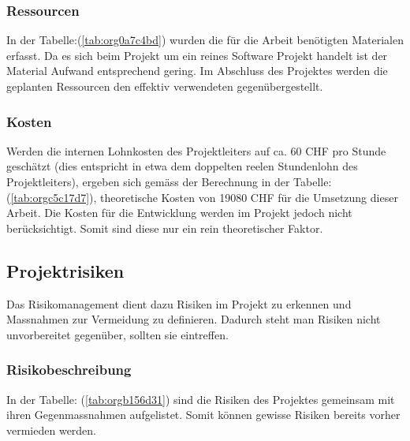 \subsubsection{Ressourcen}
\label{sec:orgf32159d}

In der Tabelle:(\ref{tab:org0a7c4bd}) wurden die für die Arbeit benötigten Materialen
erfasst. Da es sich beim Projekt um ein reines Software Projekt handelt ist der
Material Aufwand entsprechend gering. Im Abschluss des Projektes werden die
geplanten Ressourcen den effektiv verwendeten gegenübergestellt.

\subsubsection{Kosten}
\label{sec:org7c0906b}

Werden die internen Lohnkosten des Projektleiters auf ca. 60 CHF pro Stunde
geschätzt (dies entspricht in etwa dem doppelten reelen Stundenlohn des
Projektleiters), ergeben sich gemäss der Berechnung in der
Tabelle:(\ref{tab:orgc5c17d7}), theoretische Kosten von 19080 CHF für die Umsetzung
dieser Arbeit. Die Kosten für die Entwicklung werden im Projekt jedoch nicht
berücksichtigt. Somit sind diese nur ein rein theoretischer Faktor.

\subsection{Projektrisiken}
\label{sec:orge68685e}

Das Risikomanagement dient dazu Risiken im Projekt zu erkennen und Massnahmen
zur Vermeidung zu definieren. Dadurch steht man Risiken nicht
unvorbereitet gegenüber, sollten sie eintreffen.

\subsubsection{Risikobeschreibung}
\label{sec:org5fac90a}

In der Tabelle: (\ref{tab:orgb156d31}) sind die Risiken des Projektes
gemeinsam mit ihren Gegenmassnahmen aufgelistet. Somit können gewisse Risiken
bereits vorher vermieden werden.

